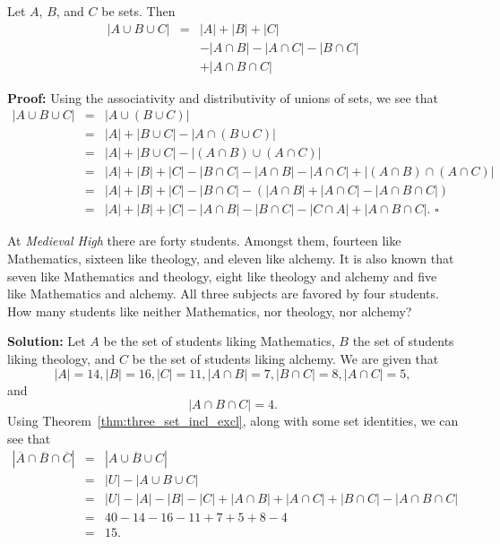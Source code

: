\begin{thm}\label{thm:three_set_incl_excl}
Let $A$, $B$, and $C$ be sets.  Then 
$$
\begin{array}{lll}
|A \cup B \cup C| & = & |A| + |B| + |C|\\ & & -
|A \cap B| - |A \cap C |   - |B \cap C| \\ & & +
|A \cap B \cap C|
\end{array}
$$

\noindent
{\bf Proof:}
Using the associativity and distributivity of unions of sets, we see
that
\begin{eqnarray*}
|A \cup B \cup C| & = & |A \cup (B \cup C)| \\
& = & |A| + |B \cup C| - |A \cap (B \cup C)| \\
& = & |A| + |B \cup C| - |(A \cap B) \cup (A \cap C)|  \\
& = & |A| + |B| + |C| - |B \cap C| - |A \cap B| - |A \cap C|+ |(A\cap B)\cap (A \cap C)| \\
& = & |A| + |B| + |C| - |B \cap C| - \left( |A \cap B| + |A \cap C|  - |A\cap B \cap C|\right) \\
& = & |A| + |B| + |C|  - |A \cap B|- |B \cap C | - |C \cap A|  + |A \cap B\cap C|. \, \, \square
\end{eqnarray*}
\end{thm}


\begin{exa} 
At {\em Medieval High} there are forty students. Amongst
them, fourteen like Mathematics, sixteen like theology, and eleven
like alchemy. It is also known that seven like Mathematics and
theology, eight like theology and alchemy and five like Mathematics
and alchemy. All three subjects are favored by four students. How
many students like neither Mathematics, nor theology, nor alchemy?

\bigskip
\noindent
{\bf Solution:}   
Let $A$ be the set of students liking Mathematics, $B$ the set
of students liking theology, and $C$ be the set of students liking
alchemy. We are given that $$ |A| = 14, |B| = 16, |C|
= 11, |A\cap B| = 7, |B\cap C| = 8, |A\cap C| = 5,$$
and
$$ |A\cap B\cap C| = 4.$$
Using Theorem~\ref{thm:three_set_incl_excl}, along with some set identities, 
we can see that
\begin{eqnarray*}
|\overline{A} \cap \overline{B} \cap \overline{C}| 
&=& |\overline{A\cup B\cup C}|\\
&=& |U| - |A\cup B\cup C|\\
&=&|U| - |A| - |B| - |C| + |A\cap B| + |A\cap C| +
|B\cap C| - |A\cap B \cap C|\\
&=& 40 - 14 - 16 - 11 + 7 + 5 + 8 - 4\\
&=&15.\
\end{eqnarray*}
\end{exa}


